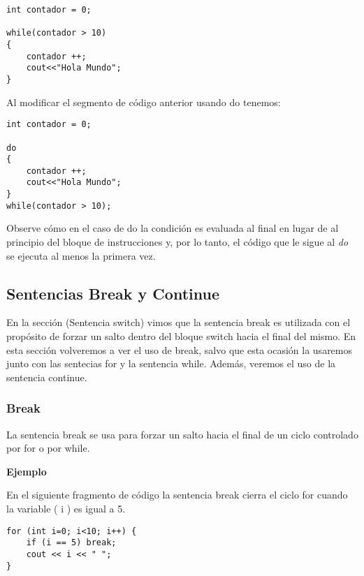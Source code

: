 \begin{lstlisting}[style=Cpp, label=sintaxis-do-while, caption=Sintaxis Do While]
int contador = 0;
 
while(contador > 10)
{
    contador ++;
    cout<<"Hola Mundo";
}
\end{lstlisting}

Al modificar el segmento de código anterior usando do tenemos:

\begin{lstlisting}[style=Cpp, label=sintaxis-do-while, caption=Sintaxis Do While]
int contador = 0;
 
do
{
    contador ++;
    cout<<"Hola Mundo";
}
while(contador > 10);
\end{lstlisting}

Observe cómo en el caso de do la condición es evaluada al final en lugar de al principio del bloque de instrucciones y, por lo tanto, el código que le sigue al \textit{do} se ejecuta al menos la primera vez.


\subsection{Sentencias Break y Continue}

En la sección (Sentencia switch) vimos que la sentencia break es utilizada con el propósito de forzar un salto dentro del bloque switch hacia el final del mismo. En esta sección volveremos a ver el uso de break, salvo que esta ocasión la usaremos junto con las sentecias for y la sentencia while. Además, veremos el uso de la sentencia continue.


\subsubsection{Break}

La sentencia break se usa para forzar un salto hacia el final de un ciclo controlado por for o por while.

\begin{center}
	\textbf{Ejemplo}
\end{center}

En el siguiente fragmento de código la sentencia break cierra el ciclo for cuando la variable ( i ) es igual a 5. 

\begin{lstlisting}[style=Cpp, label=break, caption=Break]
for (int i=0; i<10; i++) {
    if (i == 5) break;
    cout << i << " ";
}
\end{lstlisting}

